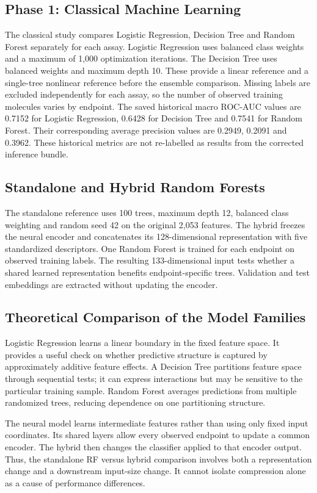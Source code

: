 \documentclass[11pt,a4paper]{article}\usepackage[margin=25mm]{geometry}\usepackage{fancyhdr}\usepackage{setspace}\usepackage{titlesec}\usepackage{xcolor}
\begin{document}
\subsection{Phase 1: Classical Machine Learning}
The classical study compares Logistic Regression, Decision Tree and Random Forest separately for each assay. Logistic Regression uses balanced class weights and a maximum of 1,000 optimization iterations. The Decision Tree uses balanced weights and maximum depth 10. These provide a linear reference and a single-tree nonlinear reference before the ensemble comparison. Missing labels are excluded independently for each assay, so the number of observed training molecules varies by endpoint. The saved historical macro ROC-AUC values are 0.7152 for Logistic Regression, 0.6428 for Decision Tree and 0.7541 for Random Forest. Their corresponding average precision values are 0.2949, 0.2091 and 0.3962. These historical metrics are not re-labelled as results from the corrected inference bundle.

\subsection{Standalone and Hybrid Random Forests}
The standalone reference uses 100 trees, maximum depth 12, balanced class weighting and random seed 42 on the original 2,053 features. The hybrid freezes the neural encoder and concatenates its 128-dimensional representation with five standardized descriptors. One Random Forest is trained for each endpoint on observed training labels. The resulting 133-dimensional input tests whether a shared learned representation benefits endpoint-specific trees. Validation and test embeddings are extracted without updating the encoder.


\subsection{Theoretical Comparison of the Model Families}
Logistic Regression learns a linear boundary in the fixed feature space. It provides a useful check on whether predictive structure is captured by approximately additive feature effects. A Decision Tree partitions feature space through sequential tests; it can express interactions but may be sensitive to the particular training sample. Random Forest averages predictions from multiple randomized trees, reducing dependence on one partitioning structure.

The neural model learns intermediate features rather than using only fixed input coordinates. Its shared layers allow every observed endpoint to update a common encoder. The hybrid then changes the classifier applied to that encoder output. Thus, the standalone RF versus hybrid comparison involves both a representation change and a downstream input-size change. It cannot isolate compression alone as a cause of performance differences.
\end{document}
